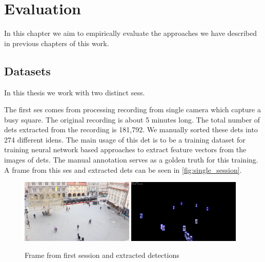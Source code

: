 \chapter{Evaluation}


In this chapter we aim to empirically evaluate the approaches we have described
in previous chapters of this work.

\section{Datasets}

In this thesis we work with two distinct \glspl{ses}.

The first \gls{ses} comes from processing recording from single camera which
capture a busy square. The original recording is about 5 minutes long. The total
number of \glspl{det} extracted from the recording is 181,792. We manually sorted
these \glspl{det} into 274 different \glspl{iden}. The main usage of this
\gls{det} is to be a training dataset for training neural network based
approaches to extract feature vectors from the images of \glspl{det}. The
manual annotation serves as a golden truth for this training. A frame from
this \gls{ses} and extracted \glspl{det} can be seen in
\autoref{fig:single_session}.

\begin{figure}
    \centering
    \includegraphics[width=0.48\textwidth]{img/frame_single_session.png}
    \includegraphics[width=0.48\textwidth]{img/frame_single_session_det.png}
    \caption{Frame from first session and extracted detections}
    \label{fig:single_session}
\end{figure}

